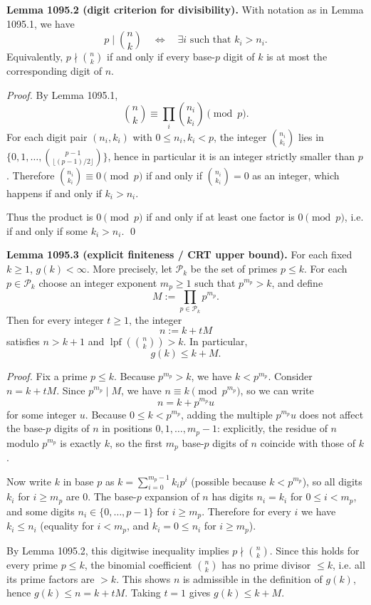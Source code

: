 \smallskip
\noindent\textbf{Lemma 1095.2 (digit criterion for divisibility).}
With notation as in Lemma 1095.1, we have
\[
 p\mid\binom{n}{k}\quad\Longleftrightarrow\quad \exists i\text{ such that }k_i>n_i.
\]
Equivalently, $p\nmid\binom{n}{k}$ if and only if every base-$p$ digit of $k$ is at most the corresponding digit of $n$.

\smallskip
\noindent\emph{Proof.}
By Lemma 1095.1,
\[
\binom{n}{k}\equiv \prod_i \binom{n_i}{k_i} \pmod p.
\]
For each digit pair $(n_i,k_i)$ with $0\le n_i,k_i<p$, the integer $\binom{n_i}{k_i}$ lies in $\{0,1,\dots,\binom{p-1}{\lfloor (p-1)/2\rfloor}\}$, hence in particular it is an integer strictly smaller than $p$. Therefore $\binom{n_i}{k_i}\equiv 0\pmod p$ if and only if $\binom{n_i}{k_i}=0$ as an integer, which happens if and only if $k_i>n_i$.

Thus the product is $0\pmod p$ if and only if at least one factor is $0\pmod p$, i.e. if and only if some $k_i>n_i$. \qed

\smallskip
\noindent\textbf{Lemma 1095.3 (explicit finiteness / CRT upper bound).}
For each fixed $k\ge 1$, $g(k)<\infty$. More precisely, let $\mathcal{P}_k$ be the set of primes $p\le k$. For each $p\in\mathcal{P}_k$ choose an integer exponent $m_p\ge 1$ such that $p^{m_p}>k$, and define
\[
M:=\prod_{p\in\mathcal{P}_k} p^{m_p}.
\]
Then for every integer $t\ge 1$, the integer
\[
 n:=k+tM
\]
satisfies $n>k+1$ and $\operatorname{lpf}(\binom{n}{k})>k$. In particular,
\[
 g(k)\le k+M.
\]

\smallskip
\noindent\emph{Proof.}
Fix a prime $p\le k$. Because $p^{m_p}>k$, we have $k<p^{m_p}$. Consider $n=k+tM$. Since $p^{m_p}\mid M$, we have $n\equiv k\pmod{p^{m_p}}$, so we can write
\[
 n=k + p^{m_p}u
\]
for some integer $u$. Because $0\le k<p^{m_p}$, adding the multiple $p^{m_p}u$ does not affect the base-$p$ digits of $n$ in positions $0,1,\dots,m_p-1$: explicitly, the residue of $n$ modulo $p^{m_p}$ is exactly $k$, so the first $m_p$ base-$p$ digits of $n$ coincide with those of $k$.

Now write $k$ in base $p$ as $k=\sum_{i=0}^{m_p-1} k_i p^i$ (possible because $k<p^{m_p}$), so all digits $k_i$ for $i\ge m_p$ are $0$. The base-$p$ expansion of $n$ has digits $n_i=k_i$ for $0\le i<m_p$, and some digits $n_i\in\{0,\dots,p-1\}$ for $i\ge m_p$. Therefore for every $i$ we have $k_i\le n_i$ (equality for $i<m_p$, and $k_i=0\le n_i$ for $i\ge m_p$).

By Lemma 1095.2, this digitwise inequality implies $p\nmid \binom{n}{k}$.
Since this holds for every prime $p\le k$, the binomial coefficient $\binom{n}{k}$ has no prime divisor $\le k$, i.e. all its prime factors are $>k$. This shows $n$ is admissible in the definition of $g(k)$, hence $g(k)\le n=k+tM$. Taking $t=1$ gives $g(k)\le k+M$.

